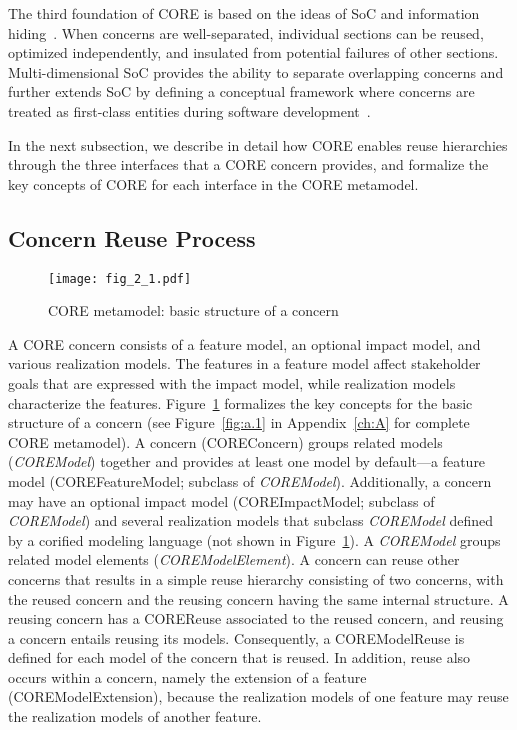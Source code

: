 The third foundation of CORE is based on the ideas of SoC and information hiding~\cite{dijkstra1976discipline, parnas1972criteria}. When concerns are well-separated, individual sections can be reused, optimized independently, and insulated from potential failures of other sections. Multi-dimensional SoC provides the ability to separate overlapping concerns and further extends SoC by defining a conceptual framework where concerns are treated as first-class entities during software development~\cite{tarr1999n}.

In the next subsection, we describe in detail how CORE enables reuse hierarchies through the three interfaces that a CORE concern provides, and formalize the key concepts of CORE for each interface in the CORE metamodel.

\subsection{Concern Reuse Process}

\begin{figure}
	\centering
	\texttt{[image: fig\_2\_1.pdf]}
	\caption{CORE metamodel: basic structure of a concern}
	\label{fig:2.1}
\end{figure}

A CORE concern consists of a feature model, an optional impact model, and various realization models. The features in a feature model affect stakeholder goals that are expressed with the impact model, while realization models characterize the features. Figure~\ref{fig:2.1} formalizes the key concepts for the basic structure of a concern (see Figure~\ref{fig:a.1} in Appendix~\ref{ch:A} for complete CORE metamodel). A concern ({\cls COREConcern}) groups related models (\textit{\cls COREModel}) together and provides at least one model by default---a feature model ({\cls COREFeatureModel}; subclass of \textit{\cls COREModel}). Additionally, a concern may have an optional impact model ({\cls COREImpactModel}; subclass of \textit{\cls COREModel}) and several realization models that subclass \textit{\cls COREModel} defined by a corified modeling language (not shown in Figure~\ref{fig:2.1}). A \textit{\cls COREModel} groups related model elements (\textit{\cls COREModelElement}). A concern can reuse other concerns that results in a simple reuse hierarchy consisting of two concerns, with the reused concern and the reusing concern having the same internal structure. A reusing concern has a {\cls COREReuse} associated to the reused concern, and reusing a concern entails reusing its models. Consequently, a {\cls COREModelReuse} is defined for each model of the concern that is reused. In addition, reuse also occurs within a concern, namely the extension of a feature ({\cls COREModelExtension}), because the realization models of one feature may reuse the realization models of another feature.

